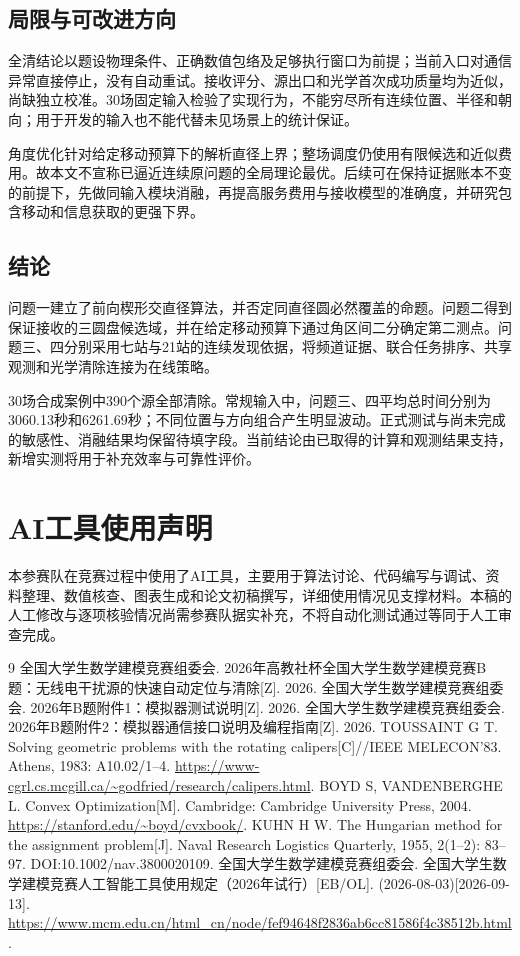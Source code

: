 \documentclass[UTF8,a4paper,12pt,fontset=fandol]{ctexart}
\newcommand{\nextpage}{\clearpage}
\begin{document}
\subsection{局限与可改进方向}
全清结论以题设物理条件、正确数值包络及足够执行窗口为前提；当前入口对通信异常直接停止，没有自动重试。接收评分、源出口和光学首次成功质量均为近似，尚缺独立校准。30场固定输入检验了实现行为，不能穷尽所有连续位置、半径和朝向；用于开发的输入也不能代替未见场景上的统计保证。

角度优化针对给定移动预算下的解析直径上界；整场调度仍使用有限候选和近似费用。故本文不宣称已逼近连续原问题的全局理论最优。后续可在保持证据账本不变的前提下，先做同输入模块消融，再提高服务费用与接收模型的准确度，并研究包含移动和信息获取的更强下界。

\subsection{结论}
问题一建立了前向楔形交直径算法，并否定同直径圆必然覆盖的命题。问题二得到保证接收的三圆盘候选域，并在给定移动预算下通过角区间二分确定第二测点。问题三、四分别采用七站与21站的连续发现依据，将频道证据、联合任务排序、共享观测和光学清除连接为在线策略。

30场合成案例中390个源全部清除。常规输入中，问题三、四平均总时间分别为3060.13秒和6261.69秒；不同位置与方向组合产生明显波动。正式测试与尚未完成的敏感性、消融结果均保留待填字段。当前结论由已取得的计算和观测结果支持，新增实测将用于补充效率与可靠性评价。

\section*{AI工具使用声明}
本参赛队在竞赛过程中使用了AI工具，主要用于算法讨论、代码编写与调试、资料整理、数值核查、图表生成和论文初稿撰写，详细使用情况见支撑材料。本稿的人工修改与逐项核验情况尚需参赛队据实补充，不将自动化测试通过等同于人工审查完成\cite{airules}。

\nextpage
\begin{thebibliography}{9}
 全国大学生数学建模竞赛组委会. 2026年高教社杯全国大学生数学建模竞赛B题：无线电干扰源的快速自动定位与清除[Z]. 2026.
 全国大学生数学建模竞赛组委会. 2026年B题附件1：模拟器测试说明[Z]. 2026.
 全国大学生数学建模竞赛组委会. 2026年B题附件2：模拟器通信接口说明及编程指南[Z]. 2026.
 TOUSSAINT G T. Solving geometric problems with the rotating calipers[C]//IEEE MELECON'83. Athens, 1983: A10.02/1--4. \url{https://www-cgrl.cs.mcgill.ca/~godfried/research/calipers.html}.
 BOYD S, VANDENBERGHE L. Convex Optimization[M]. Cambridge: Cambridge University Press, 2004. \url{https://stanford.edu/~boyd/cvxbook/}.
 KUHN H W. The Hungarian method for the assignment problem[J]. Naval Research Logistics Quarterly, 1955, 2(1--2): 83--97. DOI:10.1002/nav.3800020109.
 全国大学生数学建模竞赛组委会. 全国大学生数学建模竞赛人工智能工具使用规定（2026年试行）[EB/OL]. (2026-08-03)[2026-09-13]. \url{https://www.mcm.edu.cn/html_cn/node/fef94648f2836ab6cc81586f4c38512b.html}.
\end{thebibliography}

\label{main_end}
\clearpage

\end{document}
